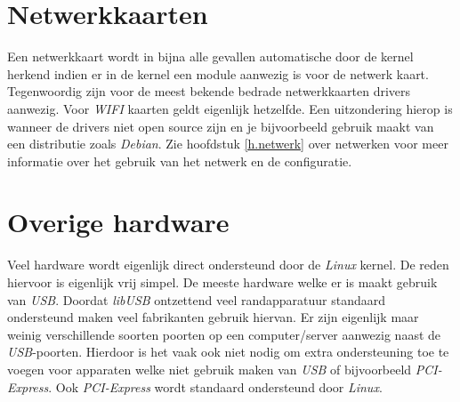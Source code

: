\section{Netwerkkaarten}
Een netwerkkaart wordt in bijna alle gevallen automatische door de kernel herkend indien er in de kernel een module aanwezig is voor de netwerk kaart. Tegenwoordig zijn voor de meest bekende bedrade netwerkkaarten drivers aanwezig. Voor \emph{WIFI} kaarten geldt eigenlijk hetzelfde. Een uitzondering hierop is wanneer de drivers niet open source zijn en je bijvoorbeeld gebruik maakt van een distributie zoals \emph{Debian}. Zie hoofdstuk \ref{h.netwerk} over netwerken voor meer informatie over het gebruik van het netwerk en de configuratie.

\section{Overige hardware}
Veel hardware wordt eigenlijk direct ondersteund door de \emph{Linux} kernel. De reden hiervoor is eigenlijk vrij simpel. De meeste hardware welke er is maakt gebruik van \emph{USB}. Doordat \emph{libUSB} ontzettend veel randapparatuur standaard ondersteund maken veel fabrikanten gebruik hiervan. Er zijn eigenlijk maar weinig verschillende soorten poorten op een computer/server aanwezig naast de \emph{USB}-poorten. Hierdoor is het vaak ook niet nodig om extra ondersteuning toe te voegen voor apparaten welke niet gebruik maken van \emph{USB} of bijvoorbeeld \emph{PCI-Express}. Ook \emph{PCI-Express} wordt standaard ondersteund door \emph{Linux}.



